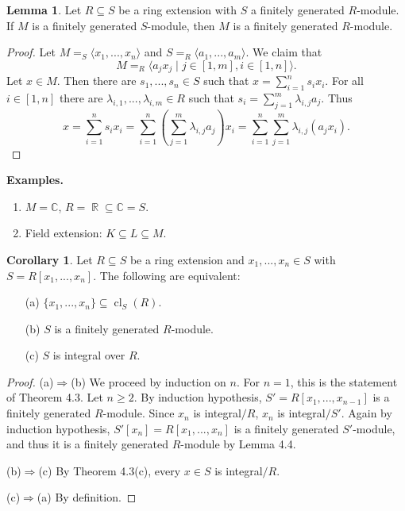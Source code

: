 \documentclass[12pt,a4paper]{report}
\theoremstyle{definition}
\newtheorem{corollary}[theorem]{Corollary} %
\newtheorem{lemma}[theorem]{Lemma}
\theoremstyle{num.custom-title}
\DeclareMathOperator{\R}{\mathbb{R}}
\DeclareMathOperator{\imp}{\Rightarrow}
\DeclareMathOperator{\sse}{\subseteq}
\DeclareMathOperator{\cl}{cl}
\newcommand{\C}{\mathbb{C}}
\begin{document}
\begin{lemma}
Let $R \sse S$ be a ring extension with $S$ a finitely generated $R$-module. If $M$ is a finitely generated $S$-module, then $M$ is a finitely generated $R$-module.
\begin{proof}
Let $M= _S \langle x_1,...,x_n \rangle$ and $S = _R \langle a_1,...,a_m \rangle$. We claim that 
\[
M = _R \langle a_j x_j \mid j \in [1,m], i \in [1,n] \rangle.
\]
Let $x \in M$. Then there are $s_1,...,s_n \in S$ such that $x = \sum_{i=1}^n s_i x_i$. For all $i \in [1,n]$ there are $\lambda_{i,1},...,\lambda_{i,m} \in R$ such that $s_i = \sum_{j=1}^m \lambda_{i,j} a_j$. Thus
\[
x = \sum_{i=1}^n s_i x_i = \sum_{i=1}^n \left( \sum_{j=1}^m \lambda_{i,j} a_j \right) x_i = \sum_{i=1}^n \sum_{j=1}^m \lambda_{i,j} (a_j x_i).
\]
\end{proof}
\end{lemma}

\noindent\textbf{Examples.}
\begin{enumerate}
\item $M=\C$, $R = \R \sse \C = S$.
\item Field extension: $K \sse L \sse M$.
\end{enumerate}

\begin{corollary}
Let $R \sse S$ be a ring extension and $x_1,...,x_n \in S$ with $S=R[x_1,...,x_n]$. The following are equivalent:
\begin{itemize}
\item[(a)] $\{x_1,...,x_n\} \sse \cl_S(R)$.
\item[(b)] $S$ is a finitely generated $R$-module.
\item[(c)] $S$ is integral over $R$.
\end{itemize}
\begin{proof}
\item[(a)$\imp$(b)] We proceed by induction on $n$. For $n=1$, this is the statement of Theorem 4.3. Let $n \geq 2$. By induction hypothesis, $S'=R[x_1,...,x_{n-1}]$ is a finitely generated $R$-module. Since $x_n$ is integral$/R$, $x_n$ is integral$/S'$. Again by induction hypothesis, $S'[x_n]=R[x_1,...,x_n]$ is a finitely generated $S'$-module, and thus it is a finitely generated $R$-module by Lemma 4.4.
\item[(b)$\imp$(c)] By Theorem 4.3(c), every $x \in S$ is integral$/R$.
\item[(c)$\imp$(a)] By definition.
\end{proof}
\end{corollary}
\end{document}
